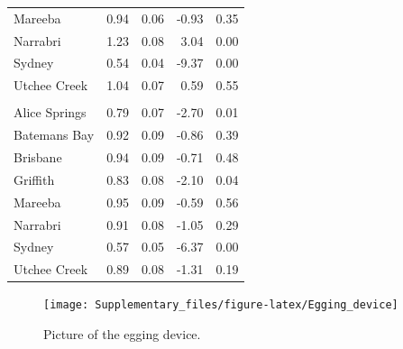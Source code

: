 \documentclass[]{article}
\begin{document}
\begin{table}[t]
\begin{tabular}{lrrrr}
\hspace{1em}Mareeba & 0.94 & 0.06 & -0.93 & 0.35\\
\hspace{1em}Narrabri & 1.23 & 0.08 & 3.04 & 0.00\\
\hspace{1em}Sydney & 0.54 & 0.04 & -9.37 & 0.00\\
\hspace{1em}Utchee Creek & 1.04 & 0.07 & 0.59 & 0.55\\
\addlinespace[0.3em]
\multicolumn{5}{l}{\textbf{Starvation}}\\
\hspace{1em}Alice Springs & 0.79 & 0.07 & -2.70 & 0.01\\
\hspace{1em}Batemans Bay & 0.92 & 0.09 & -0.86 & 0.39\\
\hspace{1em}Brisbane & 0.94 & 0.09 & -0.71 & 0.48\\
\hspace{1em}Griffith & 0.83 & 0.08 & -2.10 & 0.04\\
\hspace{1em}Mareeba & 0.95 & 0.09 & -0.59 & 0.56\\
\hspace{1em}Narrabri & 0.91 & 0.08 & -1.05 & 0.29\\
\hspace{1em}Sydney & 0.57 & 0.05 & -6.37 & 0.00\\
\hspace{1em}Utchee Creek & 0.89 & 0.08 & -1.31 & 0.19\\
\bottomrule
\end{tabular}
\end{table}

\newpage

\begin{figure}

{\centering \texttt{[image: Supplementary\_files/figure-latex/Egging\_device]} 

}

\caption{Picture of the egging device.}\label{fig:FigS1 Heat units}
\end{figure}

\newpage
\end{document}
